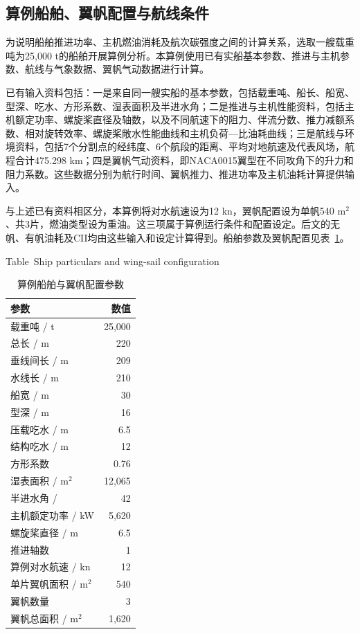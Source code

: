 \documentclass[UTF8,a4paper,twoside,zihao=5,fontset=windows]{ctexart}
\begin{document}
\subsection{算例船舶、翼帆配置与航线条件}

为说明船舶推进功率、主机燃油消耗及航次碳强度之间的计算关系，选取一艘载重吨为25,000 t的船舶开展算例分析。本算例使用已有实船基本参数、推进与主机参数、航线与气象数据、翼帆气动数据进行计算。

已有输入资料包括：一是来自同一艘实船的基本参数，包括载重吨、船长、船宽、型深、吃水、方形系数、湿表面积及半进水角；二是推进与主机性能资料，包括主机额定功率、螺旋桨直径及轴数，以及不同航速下的阻力、伴流分数、推力减额系数、相对旋转效率、螺旋桨敞水性能曲线和主机负荷—比油耗曲线；三是航线与环境资料，包括7个分割点的经纬度、6个航段的距离、平均对地航速及代表风场，航程合计475.298 km；四是翼帆气动资料，即NACA0015翼型在不同攻角下的升力和阻力系数。这些数据分别为航行时间、翼帆推力、推进功率及主机油耗计算提供输入。

与上述已有资料相区分，本算例将对水航速设为12 kn，翼帆配置设为单帆540 m$^2$、共3片，燃油类型设为重油。这三项属于算例运行条件和配置设定。后文的无帆、有帆油耗及CII均由这些输入和设定计算得到。船舶参数及翼帆配置见表~\ref{tab:case_ship}。

\begin{table}[htbp]
\centering
\small
\setlength{\tabcolsep}{6pt}
\renewcommand{\arraystretch}{1.4}
\caption{算例船舶与翼帆配置参数}
{\small Table~\thetable\quad Ship particulars and wing-sail configuration\par}
\smallskip
\label{tab:case_ship}
\begin{tabular}{@{}p{8.0cm}r@{}}
\toprule
参数 & 数值 \\
\midrule
载重吨 / t & 25,000 \\
总长 / m & 220 \\
垂线间长 / m & 209 \\
水线长 / m & 210 \\
船宽 / m & 30 \\
型深 / m & 16 \\
压载吃水 / m & 6.5 \\
结构吃水 / m & 12 \\
方形系数 & 0.76 \\
湿表面积 / m$^2$ & 12,065 \\
半进水角 / \textdegree{} & 42 \\
主机额定功率 / kW & 5,620 \\
螺旋桨直径 / m & 6.5 \\
推进轴数 & 1 \\
算例对水航速 / kn & 12 \\
单片翼帆面积 / m$^2$ & 540 \\
翼帆数量 & 3 \\
翼帆总面积 / m$^2$ & 1,620 \\
\bottomrule
\end{tabular}
\end{table}
\FloatBarrier
\end{document}
